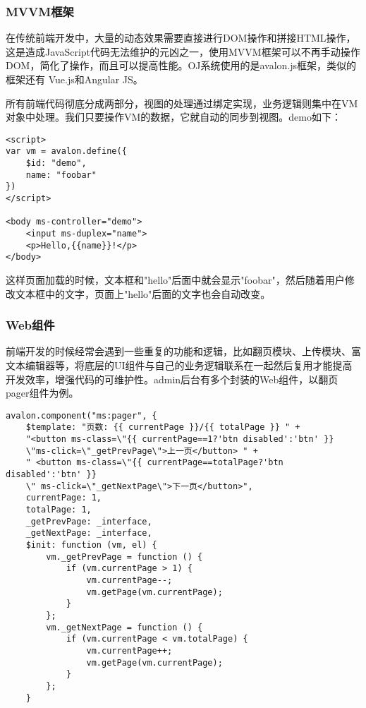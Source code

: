 \subsubsection{MVVM框架}

在传统前端开发中，大量的动态效果需要直接进行DOM操作和拼接HTML操作，这是造成JavaScript代码无法维护的元凶之一，使用MVVM框架可以不再手动操作DOM，简化了操作，而且可以提高性能。OJ系统使用的是avalon.js框架，类似的框架还有 Vue.js和Angular JS。

所有前端代码彻底分成两部分，视图的处理通过绑定实现，业务逻辑则集中在VM对象中处理。我们只要操作VM的数据，它就自动的同步到视图。demo如下：

\begin{verbatim}
<script>
var vm = avalon.define({
    $id: "demo",
    name: "foobar"
})
</script>

<body ms-controller="demo">
    <input ms-duplex="name">
    <p>Hello,{{name}}!</p>
</body>
\end{verbatim}

这样页面加载的时候，文本框和"hello"后面中就会显示"foobar"，然后随着用户修改文本框中的文字，页面上"hello"后面的文字也会自动改变。

\subsubsection{Web组件}
前端开发的时候经常会遇到一些重复的功能和逻辑，比如翻页模块、上传模块、富文本编辑器等，将底层的UI组件与自己的业务逻辑联系在一起然后复用才能提高开发效率，增强代码的可维护性。admin后台有多个封装的Web组件，以翻页pager组件为例。

\begin{verbatim}
avalon.component("ms:pager", {
    $template: "页数: {{ currentPage }}/{{ totalPage }} " +
    "<button ms-class=\"{{ currentPage==1?'btn disabled':'btn' }}
    \"ms-click=\"_getPrevPage\">上一页</button> " +
    " <button ms-class=\"{{ currentPage==totalPage?'btn disabled':'btn' }}
    \" ms-click=\"_getNextPage\">下一页</button>",
    currentPage: 1,
    totalPage: 1,
    _getPrevPage: _interface,
    _getNextPage: _interface,
    $init: function (vm, el) {
        vm._getPrevPage = function () {
            if (vm.currentPage > 1) {
                vm.currentPage--;
                vm.getPage(vm.currentPage);
            }
        };
        vm._getNextPage = function () {
            if (vm.currentPage < vm.totalPage) {
                vm.currentPage++;
                vm.getPage(vm.currentPage);
            }
        };
    }
\end{verbatim}


